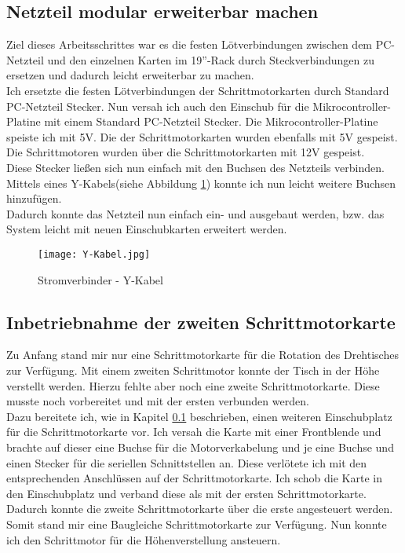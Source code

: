 \subsection{Netzteil modular erweiterbar machen}
\label{sec:Netzteil}
Ziel dieses Arbeitsschrittes war es die festen Lötverbindungen zwischen dem PC-Netzteil und den einzelnen Karten im 19''-Rack durch Steckverbindungen zu ersetzen und dadurch leicht erweiterbar zu machen.\\
Ich ersetzte die festen Lötverbindungen der Schrittmotorkarten  durch Standard PC-Netzteil Stecker. Nun versah ich auch den Einschub für die Mikrocontroller-Platine mit einem Standard PC-Netzteil Stecker. Die Mikrocontroller-Platine speiste ich mit 5V.
Die  der Schrittmotorkarten wurden ebenfalls mit 5V gespeist. Die Schrittmotoren wurden über die Schrittmotorkarten mit 12V gespeist.\\
Diese Stecker ließen sich nun einfach mit den Buchsen des Netzteils verbinden. Mittels eines Y-Kabels(siehe Abbildung \ref{fig:Y-Kabel}) konnte ich nun leicht weitere Buchsen hinzufügen.\\
Dadurch konnte das Netzteil nun einfach ein- und ausgebaut werden, bzw. das System leicht mit neuen Einschubkarten erweitert werden.
\begin{figure}[h]
\centering
\texttt{[image: Y-Kabel.jpg]}
\caption{Stromverbinder - Y-Kabel\cite{kosatec}}
\label{fig:Y-Kabel}
\end{figure}

\subsection{Inbetriebnahme der zweiten Schrittmotorkarte}
Zu Anfang stand mir nur eine Schrittmotorkarte für die Rotation des Drehtisches zur Verfügung. Mit einem zweiten Schrittmotor konnte der Tisch in der Höhe verstellt werden. Hierzu fehlte aber noch eine zweite Schrittmotorkarte. Diese musste noch vorbereitet und mit der ersten verbunden werden.\\
Dazu bereitete ich, wie in Kapitel \ref{sec:Netzteil} beschrieben, einen weiteren Einschubplatz für die Schrittmotorkarte vor. Ich versah die Karte mit einer Frontblende und brachte auf dieser eine Buchse für die Motorverkabelung und je eine Buchse und einen Stecker für die seriellen Schnittstellen an. Diese verlötete ich mit den entsprechenden Anschlüssen auf der Schrittmotorkarte. Ich schob die Karte in den Einschubplatz und verband diese als  mit der ersten Schrittmotorkarte. Dadurch konnte die zweite Schrittmotorkarte über die erste angesteuert werden.\\
Somit stand mir eine Baugleiche Schrittmotorkarte zur Verfügung. Nun  konnte ich den Schrittmotor für die Höhenverstellung ansteuern. 


